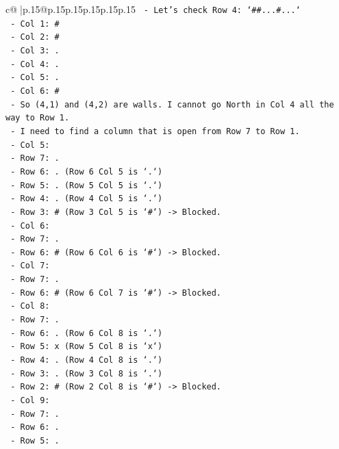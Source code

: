 \documentclass{article}
\begin{document}
{\begin{supertabular}{c@{$\;$}|p{.15\linewidth}@{}p{.15\linewidth}p{.15\linewidth}p{.15\linewidth}p{.15\linewidth}p{.15\linewidth}}
{{{\texttt{  {-} Let's check Row 4: `\#\#...\#...`} \\
\texttt{    {-} Col 1: \#} \\
\texttt{    {-} Col 2: \#} \\
\texttt{    {-} Col 3: .} \\
\texttt{    {-} Col 4: .} \\
\texttt{    {-} Col 5: .} \\
\texttt{    {-} Col 6: \#} \\
\texttt{    {-} So (4,1) and (4,2) are walls. I cannot go North in Col 4 all the way to Row 1.} \\
\texttt{  {-} I need to find a column that is open from Row 7 to Row 1.} \\
\texttt{  {-} Col 5:} \\
\texttt{    {-} Row 7: .} \\
\texttt{    {-} Row 6: . (Row 6 Col 5 is `.`)} \\
\texttt{    {-} Row 5: . (Row 5 Col 5 is `.`)} \\
\texttt{    {-} Row 4: . (Row 4 Col 5 is `.`)} \\
\texttt{    {-} Row 3: \# (Row 3 Col 5 is `\#`) {-}> Blocked.} \\
\texttt{  {-} Col 6:} \\
\texttt{    {-} Row 7: .} \\
\texttt{    {-} Row 6: \# (Row 6 Col 6 is `\#`) {-}> Blocked.} \\
\texttt{  {-} Col 7:} \\
\texttt{    {-} Row 7: .} \\
\texttt{    {-} Row 6: \# (Row 6 Col 7 is `\#`) {-}> Blocked.} \\
\texttt{  {-} Col 8:} \\
\texttt{    {-} Row 7: .} \\
\texttt{    {-} Row 6: . (Row 6 Col 8 is `.`)} \\
\texttt{    {-} Row 5: x (Row 5 Col 8 is `x`)} \\
\texttt{    {-} Row 4: . (Row 4 Col 8 is `.`)} \\
\texttt{    {-} Row 3: . (Row 3 Col 8 is `.`)} \\
\texttt{    {-} Row 2: \# (Row 2 Col 8 is `\#`) {-}> Blocked.} \\
\texttt{  {-} Col 9:} \\
\texttt{    {-} Row 7: .} \\
\texttt{    {-} Row 6: .} \\
\texttt{    {-} Row 5: .} \\
}}}
\end{supertabular}}
\end{document}
